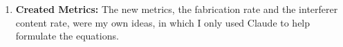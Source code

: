 \begin{enumerate}
\begin{enumerate}
    \end{enumerate}
    \item \label{ai:metrics} \textbf{Created Metrics:} The new metrics, the fabrication rate and the interferer content rate, were my own ideas, in which I only used Claude to help formulate the equations.
\end{enumerate}
